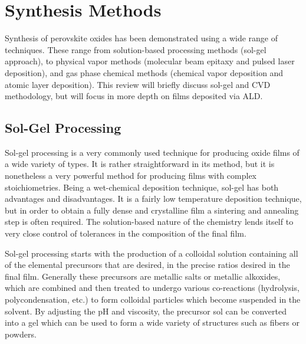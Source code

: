 \chapter{Synthesis Methods}
\label{chap:Synth}
\thispagestyle{empty}


Synthesis of perovskite oxides has been demonstrated using a wide range of techniques. These range from solution-based processing methods (sol-gel approach), to physical vapor methods (molecular beam epitaxy and pulsed laser deposition), and gas phase chemical methods (chemical vapor deposition and atomic layer deposition). This review will briefly discuss sol-gel and CVD methodology, but will focus in more depth on films deposited via ALD. 


\section{Sol-Gel Processing}
\label{sec:Synth-SolGel}

Sol-gel processing is a very commonly used technique for producing oxide films of a wide variety of types. It is rather straightforward in its method, but it is nonetheless a very powerful method for producing films with complex stoichiometries. Being a wet-chemical deposition technique, sol-gel has both advantages and disadvantages. It is a fairly low temperature deposition technique, but in order to obtain a fully dense and crystalline film a sintering and annealing step is often required. The solution-based nature of the chemistry lends itself to very close control of tolerances in the composition of the final film.\cite{brinker_sol-gel_1990,Yoldas_1979}

Sol-gel processing starts with the production of a colloidal solution containing all of the elemental precursors that are desired, in the precise ratios desired in the final film. Generally these precursors are metallic salts or metallic alkoxides, which are combined and then treated to undergo various co-reactions (hydrolysis, polycondensation, etc.) to form colloidal particles which become suspended in the solvent. By adjusting the pH and viscosity, the precursor sol can be converted into a gel which can be used to form a wide variety of structures such as fibers or powders.\cite{Fred_Al2O3_powders_1996,hanaor_solgel_tio2_2011}

